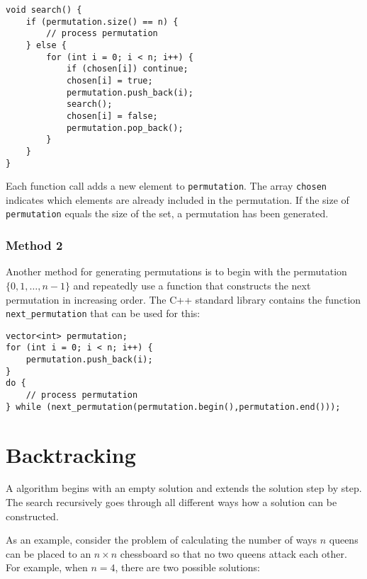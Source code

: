\begin{lstlisting}
void search() {
    if (permutation.size() == n) {
        // process permutation
    } else {
        for (int i = 0; i < n; i++) {
            if (chosen[i]) continue;
            chosen[i] = true;
            permutation.push_back(i);
            search();
            chosen[i] = false;
            permutation.pop_back();
        }
    }
}
\end{lstlisting}

Each function call adds a new element to
\texttt{permutation}.
The array \texttt{chosen} indicates which
elements are already included in the permutation.
If the size of \texttt{permutation} equals the size of the set,
a permutation has been generated.

\subsubsection{Method 2}


Another method for generating permutations
is to begin with the permutation
$\{0,1,\ldots,n-1\}$ and repeatedly
use a function that constructs the next permutation
in increasing order.
The C++ standard library contains the function
\texttt{next\_permutation} that can be used for this:

\begin{lstlisting}
vector<int> permutation;
for (int i = 0; i < n; i++) {
    permutation.push_back(i);
}
do {
    // process permutation
} while (next_permutation(permutation.begin(),permutation.end()));
\end{lstlisting}

\section{Backtracking}


A  algorithm
begins with an empty solution
and extends the solution step by step.
The search recursively
goes through all different ways how
a solution can be constructed.


As an example, consider the problem of
calculating the number
of ways $n$ queens can be placed to
an $n \times n$ chessboard so that
no two queens attack each other.
For example, when $n=4$,
there are two possible solutions:

